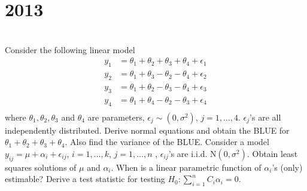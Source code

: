\section*{2013}
\vspace{-.5cm}
\hrulefill \smallskip\\
 Consider the following linear model
\[ \begin{aligned} y_1 &= \theta_1 + \theta_2 + \theta_3 + \theta_4 + \epsilon_1 \\
y_2 &= \theta_1 + \theta_3 - \theta_2 -\theta_4 + \epsilon_2 \\
y_3 &= \theta_1 + \theta_2 - \theta_3 -\theta_4 + \epsilon_3 \\
y_4 &= \theta_1 + \theta_4 - \theta_2 -\theta_3 + \epsilon_4 \\
\end{aligned}\] where $\theta_1,\theta_2,\theta_3$ and $\theta_4$ are parameters, $\epsilon_j \sim (0,\sigma^2)$, $j = 1,\ldots,4$. $\epsilon_j$'s are all independently distributed. Derive normal equations and obtain the BLUE for $\theta_1 + \theta_2 + \theta_3 + \theta_4$. Also find the variance of the BLUE.
\myline
{} Consider a  model $y_{ij} = \mu + \alpha_i + \epsilon_{ij}$, $i = 1,\ldots,k$, $j=1,\ldots,n$ , $\epsilon_{ij}$'s are i.i.d. N$(0, \sigma^2)$. Obtain least squares solutions of $\mu$ and $\alpha_i$. When is a linear parametric function of $\alpha_i$'s (only) estimable? Derive a test statistic for testing $\displaystyle H_0 : \sum_{i =1}^{n}C_i\alpha_i = 0$.